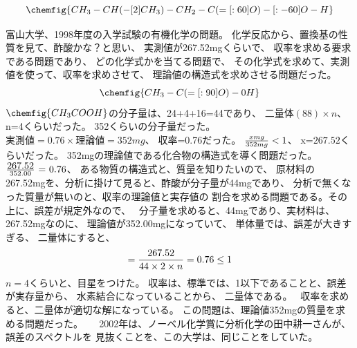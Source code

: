 \documentclass{jsarticle}
\begin{document}
\title{}
\author{}
\date{}
\maketitle
 $$  \chemfig{CH_3-CH(-[2]CH_3)-CH_2-C(=[:60]O)-[:-60]O-H} $$ 

 富山大学、1998年度の入学試験の有機化学の問題。
        化学反応から、置換基の性質を見て、酢酸かな？と思い、
	実測値が267.52mgくらいで、
	収率を求める要求である問題であり、
	どの化学式かを当てる問題で、
	その化学式を求めて、実測値を使って、収率を求めさせて、
	理論値の構造式を求めさせる問題だった。
	$$ \chemfig{CH_3-C(=[:90]O)-0H} $$
	$\chemfig{CH_3 COOH}$の分子量は、24+4+16=44であり、
	$\text{$二量体(88)\times n$}$、 n=4くらいだった。
	352くらいの分子量だった。
	$\text{$実測値=0.76\times 理論値=352mg$}$、
	収率=0.76だった。
	$\text{${xmg \over 352mg} < 1$}$、
	$\text{x=267.52}$くらいだった。
	352mgの理論値である化合物の構造式を導く問題だった。
	$\text{{$267.52 \over 352.00$} = 0.76}$、
	ある物質の構造式と、質量を知りたいので、
	原材料の267.52mgを、分析に掛けて見ると、酢酸が分子量が44mgであり、
	分析で無くなった質量が無いのと、収率の理論値と実存値の
	割合を求める問題である。その上に、誤差が規定外なので、　
	分子量を求めると、44mgであり、実材料は、267.52mgなのに、
	理論値が352.00mgになっていて、
	単体量では、誤差が大きすぎる、
	二量体にすると、
	$$ = {{267.52} \over {44 \times 2 \times n}} = 0.76 \le 1 $$
	$n = 4$くらいと、目星をつけた。
        収率は、標準では、1以下であることと、誤差が実存量から、
	水素結合になっていることから、
	二量体である。　
	収率を求めると、二量体が適切な解になっている。
	この問題は、理論値352mgの質量を求める問題だった。
	　
  2002年は、ノーベル化学賞に分析化学の田中耕一さんが、誤差のスペクトルを
	見抜くことを、この大学は、同じことをしていた。
\end{document}

